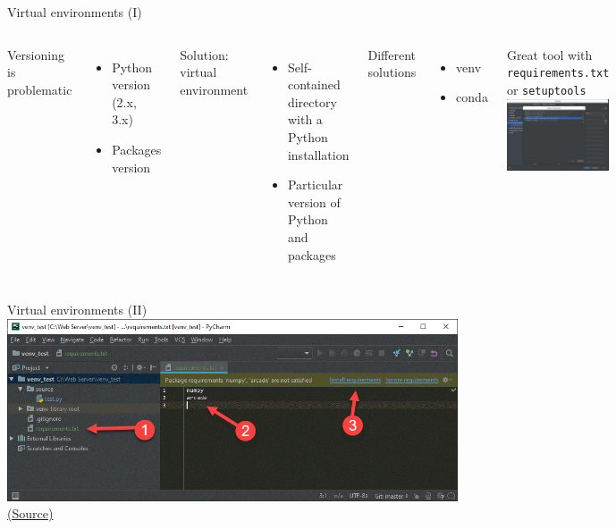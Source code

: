 \documentclass[10pt,compress]{beamer} %
\begin{document}
\begin{frame}{Virtual environments (I)}
	\begin{columns}
            Versioning is problematic
            \begin{itemize}
                \item Python version (2.x, 3.x)
                \item Packages version
            \end{itemize}
            Solution: \alert{virtual environment}
            \begin{itemize}
                \item Self-contained directory with a Python installation
                \item Particular version of Python and packages
            \end{itemize}
        	Different solutions
            \begin{itemize}
                \item venv
                \item conda
            \end{itemize}
		Great tool with \texttt{requirements.txt} or \texttt{setuptools}
	        \includegraphics[width=\linewidth]{figs/venv.png}\\
	\end{columns}
\end{frame}

\begin{frame}{Virtual environments (II)}
    \centering
	\includegraphics[width=\linewidth]{figs/requirements}\\
    \tiny{\href{https://github.com/pythonarcade/arcade/blob/development/doc/get_started/install/images/requirements.png}{(Source)}}
\end{frame}
\end{document}
